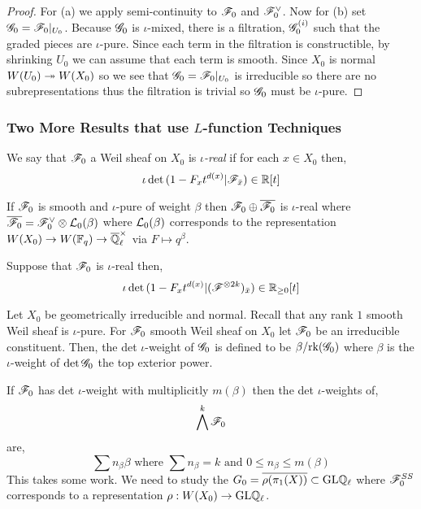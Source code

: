 \documentclass[12pt]{article}
\begin{document}
\begin{proof}
For (a) we apply semi-continuity to $\mathscr{F}_0$ and $\mathscr{F}_0^\vee$. Now for (b) set $\mathscr{G}_0 = \mathscr{F}_0 |_{U_0}$. Because $\mathscr{G}_0$ is $\iota$-mixed, there is a filtration, $\mathscr{G}_0^{(i)}$ such that the graded pieces are $\iota$-pure. Since each term in the filtration is constructible, by shrinking $U_0$ we can assume that each term is smooth. Since $X_0$ is normal $W(U_0) \twoheadrightarrow W(X_0)$ so we see that $\mathscr{G}_0 = \mathscr{F}_0|_{U_0}$ is irreducible so there are no subrepresentations thus the filtration is trivial so $\mathscr{G}_0$ must be $\iota$-pure.
\end{proof}

\subsubsection{Two More Results that use $L$-function Techniques}

\begin{defn}
We say that $\mathscr{F}_0$ a Weil sheaf on $X_0$ is \textit{$\iota$-real} if for each $x \in X_0$ then,
\[ \iota \det{(1 - F_x t^{d(x)} | \mathscr{F}_{\bar{x}})} \in \mathbb{R}[t] \]
\end{defn}

\begin{example}
If $\mathscr{F}_0$ is smooth and $\iota$-pure of weight $\beta$ then $\mathscr{F}_0 \oplus \overline{\mathscr{F}_0}$ is $\iota$-real where $\overline{\mathscr{F}_0} = \mathscr{F}_0^\vee \otimes \mathcal{L}_0(\beta)$ where $\mathcal{L}_0(\beta)$ corresponds to the representation $W(X_0) \to W(\mathbb{F}_q) \to \overline{\mathbb{Q}}_\ell^\times$ via $F \mapsto q^\beta$. 
\end{example}

\begin{rmk}
Suppose that $\mathscr{F}_0$ is $\iota$-real then,
\[ \iota \det{(1 - F_x t^{d(x)} | (\mathscr{F}^{\otimes 2k})_{\bar{x}})} \in \mathbb{R}_{\ge 0}[t] \]
\end{rmk}

\begin{defn}
Let $X_0$ be geometrically irreducible and normal. Recall that any rank $1$ smooth Weil sheaf is $\iota$-pure. For $\mathscr{F}_0$ smooth Weil sheaf on $X_0$ let $\mathscr{F}_0$ be an irreducible constituent. Then, the det $\iota$-weight of $\mathscr{G}_0$ is defined to be $\beta / \mathrm{rk}(\mathscr{G}_0)$ where $\beta$ is the $\iota$-weight of $\det{\mathscr{G}_0}$ the top exterior power.
\end{defn}

\begin{rmk}
If $\mathscr{F}_0$ has det $\iota$-weight with multiplicitly $m(\beta)$ then the det $\iota$-weights of,
\[ \bigwedge^k \mathscr{F}_0 \]
are,
\[ \sum n_\beta \beta \text{ where } \sum n_\beta = k \text{ and } 0 \le n_\beta \le m(\beta) \]
This takes some work. We need to study the $G_0 = \overline{\rho(\pi_1(X))} \subset \mathrm{GL}{}{\mathbb{Q}_\ell}$ where $\mathscr{F}_0^{SS}$ corresponds to a representation $\rho : W(X_0) \to \mathrm{GL}{}{\mathbb{Q}_\ell}$.
\end{rmk}
\end{document}

